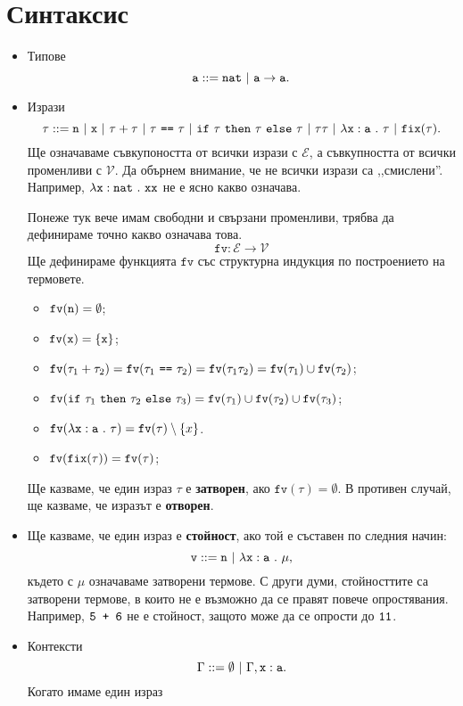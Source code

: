 \section{Синтаксис}

\newcommand{\rename}[2]{\{\vv{#1}/\vv{#2}\}}

\newcommand{\fv}{\texttt{fv}}

\begin{itemize}
\item
  Типове
  \[\vv{a} ::= \vv{nat}\ |\ \vv{a} \to \vv{a}.\]
\item
  Изрази
  \[\tau ::= \vv{n}\ |\ \vv{x}\ |\ \tau + \tau\ |\ \tau\ \vv{==}\ \tau\ |\ \ifelse{\tau}{\tau}{\tau}\ |\ \tau\tau\ |\ \lamb{x}{a}{\tau}\ |\ \fix(\tau).\]
  Ще означаваме съвкупоността от всички изрази с $\mathcal{E}$, а съвкупността от всички променливи с $\mathcal{V}$.
  Да обърнем внимание, че не всички изрази са ,,смислени''. Например,
  $\lambda\texttt{x}:\texttt{nat}\ .\ {\texttt{xx}}$ не е ясно какво означава.
  
  Понеже тук вече имам свободни и свързани променливи, трябва да дефинираме точно какво означава това.
  \[\fv:\mathcal{E} \to \mathcal{V}\]
  Ще дефинираме функцията $\texttt{fv}$ със структурна индукция по построението на термовете.
  
  \begin{itemize}
  \item
    $\fv(\vv{n}) = \emptyset$;
  \item
    $\fv(\vv{x}) = \{\vv{x}\}$;
  \item
    $\fv(\tau_1 + \tau_2) = \fv(\tau_1\ \vv{==}\ \tau_2) = \fv(\tau_1\tau_2) = \fv(\tau_1) \cup \fv(\tau_2)$;
  \item
    $\fv(\ifelse{\tau_1}{\tau_2}{\tau_3}) = \fv(\tau_1) \cup \fv(\tau_2) \cup \fv(\tau_3)$;
  \item
    $\fv(\lamb{x}{a}{\tau}) = \fv(\tau) \setminus \{x\}$.
  \item
    $\fv(\fix(\tau)) = \fv(\tau)$;
  \end{itemize}
  
  Ще казваме, че един израз $\tau$ е {\bf затворен}, ако $\fv(\tau) = \emptyset$.
  В противен случай, ще казваме, че изразът е {\bf отворен}.
\item
  Ще казваме, че един израз е {\bf стойност}, ако той е съставен по следния начин:
  \[\vv{v} ::= \vv{n}\ |\ \lamb{x}{a}{\mu},\]
  където с $\mu$ означаваме затворени термове.
  С други думи, стойносттите са затворени термове, в които не е възможно да се правят повече опростявания.
  Например, $\texttt{5 + 6}$ не е стойност, защото може да се опрости до $\texttt{11}$.
\item
  Контексти
  \[\Gamma ::= \emptyset\ |\ \Gamma,\type{x}{a}.\]
  Когато имаме един израз 
\end{itemize}

